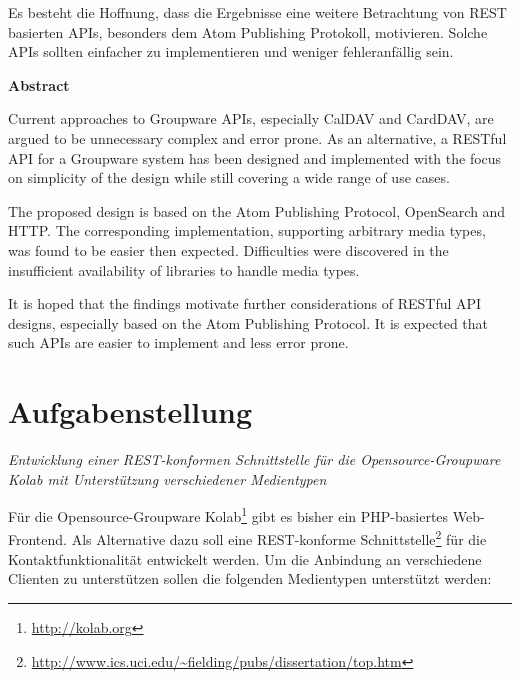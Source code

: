 \documentclass[11pt,a4paper,headsepline,twoside]{scrartcl}		%
\begin{document}
Es besteht die Hoffnung, dass die Ergebnisse eine weitere Betrachtung von REST
basierten APIs, besonders dem Atom Publishing Protokoll, motivieren. Solche APIs
sollten einfacher zu implementieren und weniger fehleranfällig sein.

\vspace{1cm}
\Large{\textbf{Abstract}}
\vspace{1cm}
\normalsize{}


  
  Current approaches to Groupware APIs, especially CalDAV and CardDAV, are
  argued to be unnecessary complex and error prone.  As an alternative, a
  RESTful API for a Groupware system has been designed and implemented with the
  focus on simplicity of the design while still covering a wide range of use
  cases.

  The proposed design is based on the Atom Publishing Protocol, OpenSearch
  and HTTP.
  The corresponding implementation, supporting arbitrary media types, was found
  to be easier then expected. Difficulties were discovered in the insufficient
  availability of libraries to handle media types.

  It is hoped that the findings motivate further considerations of RESTful API
  designs, especially based on the Atom Publishing Protocol. It is expected that
  such APIs are easier to implement and less error prone.

\section*{Aufgabenstellung}
\pagestyle{headings}
\textit{Entwicklung einer REST-konformen Schnittstelle für die 
Opensource-Groupware Kolab mit Unterstützung verschiedener Medientypen}

Für die Opensource-Groupware Kolab\footnote{\url{http://kolab.org}} gibt es
bisher ein PHP-basiertes Web-Frontend. Als Alternative dazu soll eine
REST-konforme
Schnittstelle\footnote{\url{http://www.ics.uci.edu/~fielding/pubs/dissertation/top.htm}}
für die Kontaktfunktionalität entwickelt werden. Um die Anbindung an
verschiedene Clienten zu unterstützen sollen die folgenden Medientypen
unterstützt werden:
\end{document}
